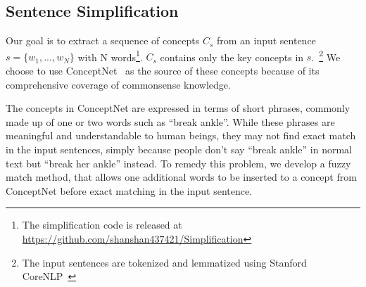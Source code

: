 \subsection{Sentence Simplification}
\label{sec:simp}


Our goal is to extract a sequence of concepts $C_s$
from an input sentence $s = \{w_1, ..., w_N\}$ with N words\footnote{The simplification 
code is released at \url{https://github.com/shanshan437421/Simplification}}. 
$C_s$ contains only the key concepts in $s$.~\footnote{The input sentences are 
tokenized and lemmatized using Stanford CoreNLP~\cite{manning2014stanford} }
We choose to use ConceptNet~\cite{speer2017conceptnet} as the source of
these concepts because of its comprehensive coverage of 
commonsense knowledge. %

The concepts in ConceptNet are
expressed in terms of short phrases, commonly made up of one or two words
such as ``break ankle''. While these phrases are meaningful and
understandable to human beings, they may not find exact match
in the input sentences, simply because people don't say ``break ankle'' in
normal text but ``break her ankle'' instead.  
To remedy this problem, we develop a fuzzy match method, that allows
one additional words to be inserted to a concept from ConceptNet
before exact matching in the input sentence.

